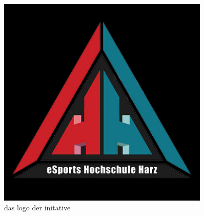     \begin{figure}[H]
        \centering
        \includegraphics[width=0.9\textwidth]{graphics/logo black.jpg}
        \caption[logo]{das logo der initative}
        \label{fig:appendix_logo2}
    \end{figure}